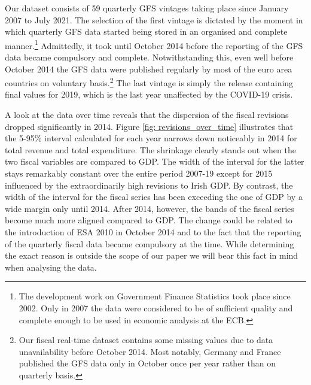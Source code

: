 Our dataset consists of 59 quarterly GFS vintages taking place since January 2007 to July 2021. The selection of the first vintage is dictated by the moment in which quarterly GFS data started being stored in an organised and complete manner.\footnote{The development work on Government Finance Statistics took place since 2002. Only in 2007 the data were considered to be of sufficient quality and complete enough to be used in economic analysis at the ECB.} Admittedly, it took until October 2014 before the reporting of the GFS data became compulsory and complete. Notwithstanding this, even well before October 2014 the GFS data were published regularly by most of the euro area countries on voluntary basis.\footnote{Our fiscal real-time dataset contains some missing values due to data unavailability before October 2014. Most notably, Germany and France published the GFS data only in October once per year rather than on quarterly basis.} The last vintage is simply the release containing final values for 2019, which is the last year unaffected by the COVID-19 crisis.

% 

A look at the data over time reveals that the dispersion of the fiscal revisions dropped significantly in 2014. Figure \ref{fig: revisions_over_time} illustrates that the 5-95\% interval calculated for each year narrows down noticeably in 2014 for total revenue and total expenditure. The shrinkage clearly stands out when the two fiscal variables are compared to GDP. The width of the interval for the latter stays remarkably constant over the entire period 2007-19 except for 2015 influenced by the extraordinarily high revisions to Irish GDP. By contrast, the width of the interval for the fiscal series has been exceeding the one of GDP by a wide margin only until 2014. After 2014, %
however, the bands of the fiscal series become much more aligned compared to  GDP. The change could be related to the introduction of ESA 2010 in October 2014 and to the fact that the reporting of the quarterly fiscal data became compulsory  at the time. While determining the exact reason is outside the scope of our paper we will bear this fact in mind when analysing the data.
